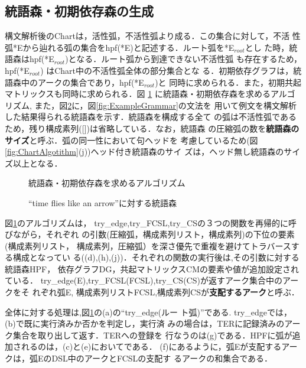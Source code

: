 \subsection{統語森・初期依存森の生成}\label{sec:PFandDFseisei}
構文解析後のChartは，活性弧，不活性弧より成る．この集合に対して，不活
性弧*Eから辿れる弧の集合をhpf(*E)と記述する．ルート弧を*E$_{root}$とし
た時，統語森はhpf(*E$_{root}$)となる．ルート弧から到達できない不活性弧
も存在するため，hpf(*E$_{root}$) はChart中の不活性弧全体の部分集合とな
る．初期依存グラフは，統語森中のアークの集合であり，hpf(*E$_{root}$)と
同時に求められる．また，初期共起マトリックスも同時に求められる．図
\ref{fig:HPF_IDF_Algorithm} に統語森・初期依存森を求めるアルゴリズム, 
また，図\ref{fig:PDGParseForest}に，図\ref{fig:ExampleGrammar}の文法を
用いて例文を構文解析した結果得られる統語森を示す．統語森を構成する全て
の弧は不活性弧であるため，残り構成素列([])は省略している．なお，統語森
の圧縮弧の数を{\bf 統語森のサイズ}と呼ぶ．弧の同一性において句ヘッドを
考慮しているため(図\ref{fig:ChartAlgotithm}(j))ヘッド付き統語森のサイ
ズは，ヘッド無し統語森のサイズ以上となる．

\begin{figure}[t]
 \begin{center}
 \end{center}
\myfiglabelskip
\caption{統語森・初期依存森を求めるアルゴリズム}
\label{fig:HPF_IDF_Algorithm}
\end{figure}

\begin{figure}[t]
 \begin{center}
 \end{center}
\myfiglabelskip
\caption{``time flies like an arrow''に対する統語森}
\label{fig:PDGParseForest}
\end{figure}

図\ref{fig:HPF_IDF_Algorithm}のアルゴリズムは，
try\_edge,try\_FCSL,try\_CSの３つの関数を再帰的に呼びながら，それぞれ
の引数(圧縮弧，構成素列リスト，構成素列)の下位の要素(構成素列リスト，
構成素列，圧縮弧）を深さ優先で重複を避けてトラバースする構成となってい
る((d),(h),(j))．それぞれの関数の実行後は,その引数に対する統語森HPF，
依存グラフDG，共起マトリックスCMの要素や値が追加設定されている．
try\_edge(E),try\_FCSL(FCSL),try\_CS(CS)が返すアーク集合中のアークをそ
れぞれ弧E, 構成素列リストFCSL,構成素列CSが{\bf 支配するアーク}と呼ぶ．

全体に対する処理は,図\ref{fig:HPF_IDF_Algorithm}の(a)の``try\_edge(ルー
ト弧)''である.  try\_edgeでは，(b)で既に実行済みか否かを判定し，実行済
みの場合は，TERに記録済みのアーク集合を取り出して返す．TERへの登録を
行なうのは(g)である．HPFに弧が追加されるのは，(c)と(e)においてである．
(f)にあるように，弧Eが支配するアークは，弧EのDSL中のアークとFCSLの支配す
るアークの和集合である．

